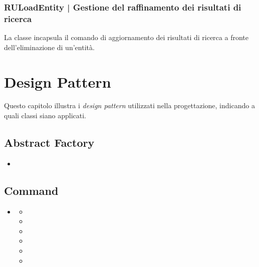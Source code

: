 \documentclass[10pt,a4paper,headinclude,footinclude,hidelinks]{scrreprt} %
\begin{document}
	\subsection[RULoadEntity]{RULoadEntity | Gestione del raffinamento dei risultati di ricerca}
	\label{sec:stage:design:controller.search:result-update-load-entity}
	La classe \textit{} incapsula il comando di aggiornamento dei risultati di ricerca a fronte dell'eliminazione di un'entità.

	\chapter{Design Pattern}
	\label{ch:stage:design:pattern}
	Questo capitolo illustra i \textit{design pattern} utilizzati nella progettazione, indicando a quali classi siano applicati.

	\section{Abstract Factory}
	\label{sec:stage:design:pattern:factory}
	\begin{itemize}
	\item {}
	\end{itemize}

	\section{Command}
	\label{sec:stage:design:pattern:command}
	\begin{itemize}
	\item {}
	\begin{itemize}
	\item {}
	\item {}
	\item {}
	\item {}
	\item {}
	\item {}
	\end{itemize}
	\end{itemize}
\end{document}
